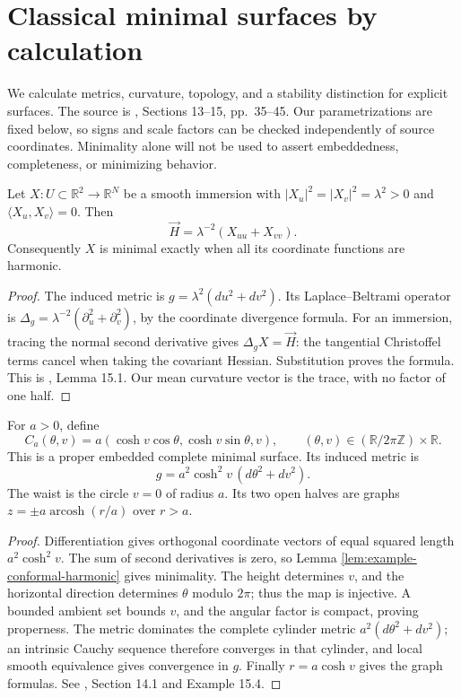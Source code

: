 \chapter{Classical minimal surfaces by calculation}\label{sec:examples-minimal}
We calculate metrics, curvature, topology, and a stability distinction for explicit surfaces. The source is \cite{ChMin}, Sections 13--15, pp.~35--45. Our parametrizations are fixed below, so signs and scale factors can be checked independently of source coordinates. Minimality alone will not be used to assert embeddedness, completeness, or minimizing behavior.

\begin{lemma}\label{lem:example-conformal-harmonic}
Let $X:U\subset\mathbb R^2\to\mathbb R^N$ be a smooth immersion with $|X_u|^2=|X_v|^2=\lambda^2>0$ and $\langle X_u,X_v\rangle=0$. Then
\[
 \vec H=\lambda^{-2}(X_{uu}+X_{vv}).
\]
Consequently $X$ is minimal exactly when all its coordinate functions are harmonic.
\end{lemma}
\begin{proof}
The induced metric is $g=\lambda^2(du^2+dv^2)$. Its Laplace--Beltrami operator is $\Delta_g=\lambda^{-2}(\partial_u^2+\partial_v^2)$, by the coordinate divergence formula. For an immersion, tracing the normal second derivative gives $\Delta_gX=\vec H$: the tangential Christoffel terms cancel when taking the covariant Hessian. Substitution proves the formula. This is \cite{ChMin}, Lemma 15.1. Our mean curvature vector is the trace, with no factor of one half.
\end{proof}

\begin{example}\label{ex:explicit-catenoid}
For $a>0$, define
\[
 C_a(\theta,v)=a(\cosh v\cos\theta,\cosh v\sin\theta,v),
 \qquad(\theta,v)\in(\mathbb R/2\pi\mathbb Z)\times\mathbb R.
\]
This is a proper embedded complete minimal surface. Its induced metric is
\[
 g=a^2\cosh^2v\,(d\theta^2+dv^2).
\]
The waist is the circle $v=0$ of radius $a$. Its two open halves are graphs $z=\pm a\operatorname{arcosh}(r/a)$ over $r>a$.
\end{example}
\begin{proof}
Differentiation gives orthogonal coordinate vectors of equal squared length $a^2\cosh^2v$. The sum of second derivatives is zero, so Lemma \ref{lem:example-conformal-harmonic} gives minimality. The height determines $v$, and the horizontal direction determines $\theta$ modulo $2\pi$; thus the map is injective. A bounded ambient set bounds $v$, and the angular factor is compact, proving properness. The metric dominates the complete cylinder metric $a^2(d\theta^2+dv^2)$; an intrinsic Cauchy sequence therefore converges in that cylinder, and local smooth equivalence gives convergence in $g$. Finally $r=a\cosh v$ gives the graph formulas. See \cite{ChMin}, Section 14.1 and Example 15.4.
\end{proof}

